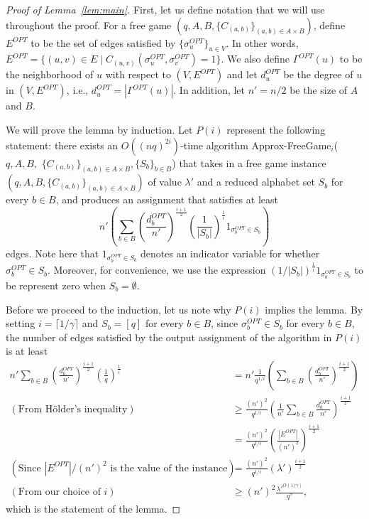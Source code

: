\documentclass{article}
\begin{document}
\begin{proof}[Proof of Lemma~\ref{lem:main}]
First, let us define notation that we will use throughout the proof. For a free game $(q, A, B, \{C_{(a, b)}\}_{(a, b) \in A \times B})$, define $E^{OPT}$ to be the set of edges satisfied by $\{\sigma^{OPT}_u\}_{u \in V}$. In other words, $E^{OPT} = \{(u, v) \in E \mid C_{(u, v)}(\sigma^{OPT}_u, \sigma^{OPT}_v) = 1\}$. We also define $\Gamma^{OPT}(u)$ to be the neighborhood of $u$ with respect to $(V, E^{OPT})$ and let $d^{OPT}_u$ be the degree of $u$ in $(V, E^{OPT})$, i.e., $d^{OPT}_u = |\Gamma^{OPT}(u)|$. In addition, let $n' = n/2$ be the size of $A$ and $B$.

We will prove the lemma by induction. Let $P(i)$ represent the following statement: there exists an $O\left((nq)^{2i}\right)$-time algorithm {\sc Approx-FreeGame$_i$}($q, A, B,$ $\{C_{(a, b)}\}_{(a, b) \in A \times B}, \{S_b\}_{b \in B}$) that takes in a free game instance $(q, A, B, \{C_{(a, b)}\}_{(a, b) \in A \times B})$ of value $\lambda'$ and a reduced alphabet set $S_b$ for every $b \in B$, and produces an assignment that satisfies at least $$n'\left(\sum_{b \in B} \left(\frac{d^{OPT}_b}{n'}\right)^\frac{i+1}{2}\left(\frac{1}{|S_b|}\right)^\frac{1}{i}1_{\sigma_b^{OPT} \in S_b}\right)$$ edges. Note here that $1_{\sigma_b^{OPT} \in S_b}$ denotes an indicator variable for whether $\sigma_b^{OPT} \in S_b$. Moreover, for convenience, we use the expression $\left(1/|S_b|\right)^\frac{1}{i}1_{\sigma_b^{OPT} \in S_b}$ to be represent zero when $S_b = \emptyset$.

Before we proceed to the induction, let us note why $P(i)$ implies the lemma. By setting $i = \lceil 1/\gamma \rceil$ and $S_b = [q]$ for every $b \in B$, since $\sigma_b^{OPT} \in S_b$ for every $b \in B$, the number of edges satisfied by the output assignment of the algorithm in $P(i)$ is at least
\begin{align*}
  n' \sum_{b \in B} \left(\frac{d^{OPT}_b}{n'}\right)^\frac{i+1}{2}\left(\frac{1}{q}\right)^\frac{1}{i} &= n' \frac{1}{q^{1/i}} \left(\sum_{b \in B} \left(\frac{d^{OPT}_b}{n'}\right)^\frac{i+1}{2}\right) \\
  (\text{From H\"{o}lder's inequality}) &\geq \frac{(n')^2}{q^{1/i}} \left(\frac{1}{n'}\sum_{b \in B} \frac{d^{OPT}_b}{n'}\right)^\frac{i+1}{2} \\
  &= \frac{(n')^2}{q^{1/i}} \left(\frac{|E^{OPT}|}{(n')^2}\right)^\frac{i+1}{2} \\
  (\text{Since } |E^{OPT}|/(n')^2 \text{ is the value of the instance}) &= \frac{(n')^2}{q^{1/i}} \left(\lambda'\right)^\frac{i+1}{2} \\
  (\text{From our choice of } i) &\geq (n')^2 \frac{\lambda'^{O(1/\gamma)}}{q^{\gamma}},
\end{align*}
which is the statement of the lemma.


\end{proof}
\end{document}
